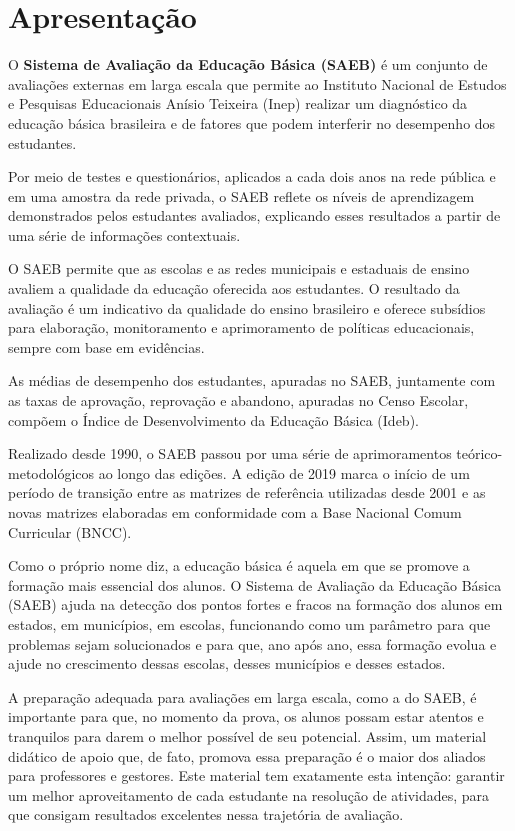 \chapter{Apresentação}

O \textbf{Sistema de Avaliação da Educação Básica (SAEB)} é um conjunto
de avaliações externas em larga escala que permite ao Instituto Nacional
de Estudos e Pesquisas Educacionais Anísio Teixeira (Inep) realizar um
diagnóstico da educação básica brasileira e de fatores que podem
interferir no desempenho dos estudantes.

Por meio de testes e questionários, aplicados a cada dois anos na rede
pública e em uma amostra da rede privada, o SAEB reflete os níveis de
aprendizagem demonstrados pelos estudantes avaliados, explicando esses
resultados a partir de uma série de informações contextuais.

O SAEB permite que as escolas e as redes municipais e estaduais de
ensino avaliem a qualidade da educação oferecida aos estudantes. O
resultado da avaliação é um indicativo da qualidade do ensino brasileiro
e oferece subsídios para elaboração, monitoramento e aprimoramento de
políticas educacionais, sempre com base em evidências.

As médias de desempenho dos estudantes, apuradas no SAEB, juntamente com
as taxas de aprovação, reprovação e abandono, apuradas no Censo Escolar,
compõem o Índice de Desenvolvimento da Educação Básica (Ideb).

Realizado desde 1990, o SAEB passou por uma série de aprimoramentos
teórico-metodológicos ao longo das edições. A edição de 2019 marca o
início de um período de transição entre as matrizes de referência
utilizadas desde 2001 e as novas matrizes elaboradas em conformidade com
a Base Nacional Comum Curricular (BNCC).


Como o próprio nome diz, a educação básica é aquela em que se promove a
formação mais essencial dos alunos. O Sistema de Avaliação da Educação
Básica (SAEB) ajuda na detecção dos pontos fortes e fracos na formação
dos alunos em estados, em municípios, em escolas, funcionando como um
parâmetro para que problemas sejam solucionados e para que, ano após
ano, essa formação evolua e ajude no crescimento dessas escolas, desses
municípios e desses estados.

A preparação adequada para avaliações em larga escala, como a do SAEB, é
importante para que, no momento da prova, os alunos possam estar atentos
e tranquilos para darem o melhor possível de seu potencial. Assim, um
material didático de apoio que, de fato, promova essa preparação é o
maior dos aliados para professores e gestores. Este material tem
exatamente esta intenção: garantir um melhor aproveitamento de cada
estudante na resolução de atividades, para que consigam resultados
excelentes nessa trajetória de avaliação.


